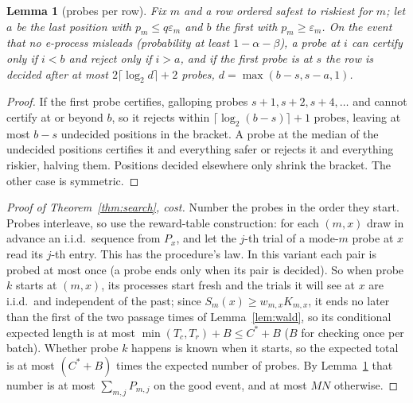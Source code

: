 \documentclass{article}
\newtheorem{lemma}{Lemma}
\newcommand{\eps}{\varepsilon}
\begin{document}
\begin{lemma}[probes per row]\label{lem:probes}
Fix $m$ and a row ordered safest to riskiest for $m$; let $a$ be the last
position with $p_m\le q\eps_m$ and $b$ the first with $p_m\ge\eps_m$. On
the event that no e-process misleads (probability at least
$1-\alpha-\beta$), a probe at $i$ can certify only if $i<b$ and reject only
if $i>a$, and if the first probe is at $s$ the row is decided after at most
$2\lceil\log_2 d\rceil+2$ probes, $d=\max(b-s,s-a,1)$.
\end{lemma}
\begin{proof}
If the first probe certifies, galloping probes $s+1,s+2,s+4,\dots$ and
cannot certify at or beyond $b$, so it rejects within
$\lceil\log_2(b-s)\rceil+1$ probes, leaving at most $b-s$ undecided
positions in the bracket. A probe at the median of the undecided positions
certifies it and everything safer or rejects it and everything riskier,
halving them. Positions decided elsewhere only shrink the bracket. The
other case is symmetric.
\end{proof}

\begin{proof}[Proof of Theorem~\ref{thm:search}, cost]
Number the probes in the order they start. Probes interleave, so use the
reward-table construction: for each $(m,x)$ draw in advance an i.i.d.\
sequence from $P_x$, and let the $j$-th trial of a mode-$m$ probe at $x$
read its $j$-th entry. This has the procedure's law. In this variant each
pair is probed at most once (a probe ends only when its pair is decided).
So when probe $k$ starts at $(m,x)$, its processes start fresh and the
trials it will see at $x$ are i.i.d.\ and independent of the past; since $S_m(x)\ge w_{m,x}K_{m,x}$, it
ends no later than the first of the two passage times of
Lemma~\ref{lem:wald}, so its conditional expected length is at most
$\min(T_c,T_r)+B\le C^*+B$ ($B$ for checking once per batch). Whether probe
$k$ happens is known when it starts, so the expected total is at most
$(C^*+B)$ times the expected number of probes. By
Lemma~\ref{lem:probes} that number is at most $\sum_{m,j}P_{m,j}$ on the
good event, and at most $MN$ otherwise.
\end{proof}
\end{document}
